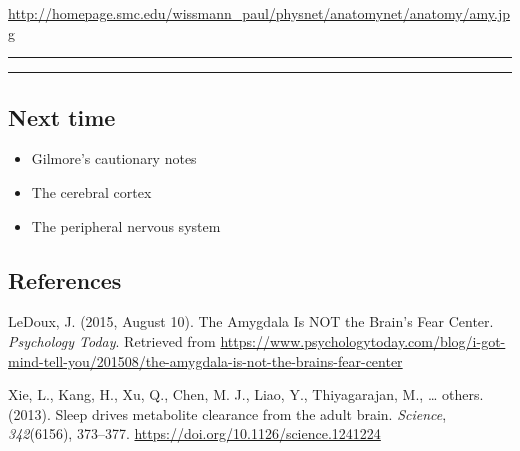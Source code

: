 \documentclass[]{article}
\providecommand{\tightlist}{%
  \setlength{\itemsep}{0pt}\setlength{\parskip}{0pt}}
\begin{document}
\url{http://homepage.smc.edu/wissmann_paul/physnet/anatomynet/anatomy/amy.jpg}

\begin{center}\rule{0.5\linewidth}{\linethickness}\end{center}

\begin{center}\rule{0.5\linewidth}{\linethickness}\end{center}

\subsection{Next time}\label{next-time}

\begin{itemize}
\tightlist
\item
  Gilmore's cautionary notes
\item
  The cerebral cortex
\item
  The peripheral nervous system
\end{itemize}

\subsection*{References}\label{references}

\hypertarget{refs}{}
\hypertarget{ref-ledoux_amygdala_2015}{}
LeDoux, J. (2015, August 10). The Amygdala Is NOT the Brain's Fear
Center. \emph{Psychology Today}. Retrieved from
\url{https://www.psychologytoday.com/blog/i-got-mind-tell-you/201508/the-amygdala-is-not-the-brains-fear-center}

\hypertarget{ref-xie2013sleep}{}
Xie, L., Kang, H., Xu, Q., Chen, M. J., Liao, Y., Thiyagarajan, M.,
\ldots{} others. (2013). Sleep drives metabolite clearance from the
adult brain. \emph{Science}, \emph{342}(6156), 373--377.
\url{https://doi.org/10.1126/science.1241224}
\end{document}
